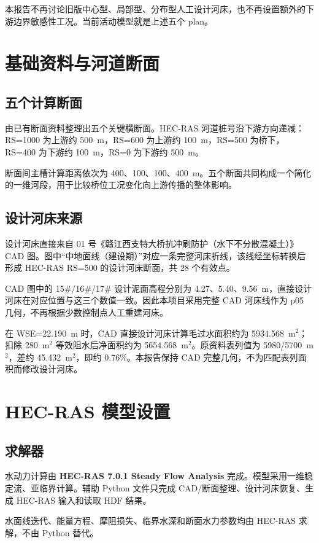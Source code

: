 \documentclass[UTF8,a4paper,12pt]{ctexart}
\begin{document}
本报告不再讨论旧版中心型、局部型、分布型人工设计河床，也不再设置额外的下游边界敏感性工况。当前活动模型就是上述五个 plan。

\section{基础资料与河道断面}
\subsection{五个计算断面}
由已有断面资料整理出五个关键横断面。HEC-RAS 河道桩号沿下游方向递减：RS=1000 为上游约 500~m，RS=600 为上游约 100~m，RS=500 为桥下，RS=400 为下游约 100~m，RS=0 为下游约 500~m。

断面间主槽计算距离依次为 400、100、100、400~m。五个断面共同构成一个简化的一维河段，用于比较桥位工况变化向上游传播的整体影响。

\subsection{设计河床来源}
设计河床直接来自 01 号《赣江西支特大桥抗冲刷防护（水下不分散混凝土）》CAD 图。图中“中地面线（建设期）”对应一条完整河床折线，该线经坐标转换后形成 HEC-RAS RS=500 的设计河床断面，共 28 个有效点。

CAD 图中的 15\#/16\#/17\# 设计泥面高程分别为 4.27、5.40、9.56~m，直接设计河床在对应位置与这三个数值一致。因此本项目采用完整 CAD 河床线作为 p05 几何，不再根据少数控制点人工重建河床。

在 WSE=22.190~m 时，CAD 直接设计河床计算毛过水面积约为 5934.568~m$^2$；扣除 280~m$^2$ 等效阻水后净面积约为 5654.568~m$^2$。原资料表列值为 5980/5700~m$^2$，差约 45.432~m$^2$，即约 0.76\%。本报告保持 CAD 完整几何，不为匹配表列面积而修改设计河床。

\section{HEC-RAS 模型设置}
\subsection{求解器}
水动力计算由 \textbf{HEC-RAS 7.0.1 Steady Flow Analysis} 完成。模型采用一维稳定流、亚临界计算。辅助 Python 文件只完成 CAD/断面整理、设计河床恢复、生成 HEC-RAS 输入和读取 HDF 结果。

水面线迭代、能量方程、摩阻损失、临界水深和断面水力参数均由 HEC-RAS 求解，不由 Python 替代。
\end{document}

